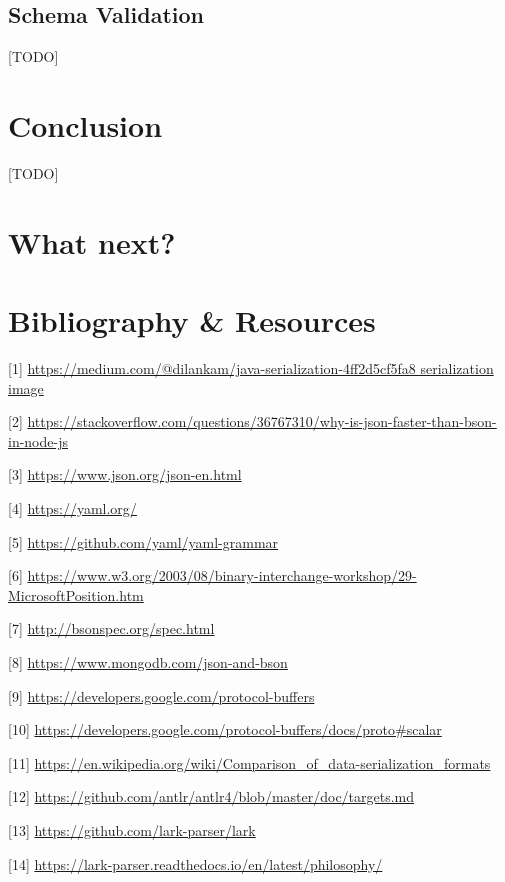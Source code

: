 \documentclass[12pt]{article}
\begin{document}
\subsection{Schema Validation}
[TODO]

\pagebreak

\section{Conclusion}
[TODO]

\pagebreak

\section{What next?}

\pagebreak

\section{Bibliography \& Resources}
[1] \url{https://medium.com/@dilankam/java-serialization-4ff2d5cf5fa8 serialization image}
 
[2] \url{https://stackoverflow.com/questions/36767310/why-is-json-faster-than-bson-in-node-js} 

[3] \url{https://www.json.org/json-en.html} 

[4] \url{https://yaml.org/} 

[5] \url{https://github.com/yaml/yaml-grammar} 

[6] \url{https://www.w3.org/2003/08/binary-interchange-workshop/29-MicrosoftPosition.htm} 

[7] \url{http://bsonspec.org/spec.html} 

[8] \url{https://www.mongodb.com/json-and-bson} 

[9] \url{https://developers.google.com/protocol-buffers} 

[10] \url{https://developers.google.com/protocol-buffers/docs/proto#scalar} 

[11] \url{https://en.wikipedia.org/wiki/Comparison_of_data-serialization_formats}

[12] \url{https://github.com/antlr/antlr4/blob/master/doc/targets.md}

[13] \url{https://github.com/lark-parser/lark}

[14] \url{https://lark-parser.readthedocs.io/en/latest/philosophy/}
\end{document}
